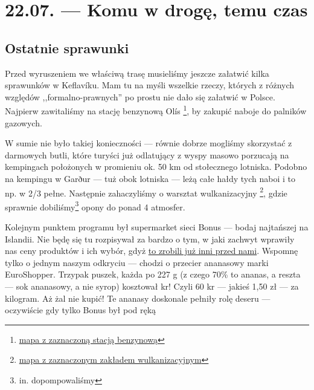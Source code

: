 \chapter*{22.07. --- Komu w drogę, temu czas}

\section*{Ostatnie sprawunki}

\indent Przed wyruszeniem we właściwą trasę musieliśmy jeszcze załatwić kilka sprawunków w Keflavíku. Mam tu na myśli wszelkie rzeczy, których z różnych względów ,,formalno-prawnych'' po prostu nie dało się załatwić w Polsce.
Najpierw zawitaliśmy na stację benzynową Olís \footnote{\href{https://www.google.com/url?q=https\%3A\%2F\%2Fmaps.google.com\%2Fmaps\%3Fq\%3D63.979816\%2C-22.54672}{mapa z zaznaczoną stacją benzynową}}, by zakupić naboje do palników gazowych.

W sumie nie było takiej konieczności --- równie dobrze mogliśmy skorzystać z darmowych butli, które turyści już odlatujący z wyspy masowo porzucają na kempingach położonych w promieniu ok. 50 km od stołecznego lotniska. Podobno na kempingu w Garður --- tuż obok lotniska --- leżą całe hałdy tych naboi i to np. w 2/3 pełne.
Następnie zahaczyliśmy o warsztat wulkanizacyjny \footnote{\href{https://www.google.com/url?q=https\%3A\%2F\%2Fmaps.google.com\%2Fmaps\%3Fq\%3D63.982619\%2C-22.546328}{mapa z zaznaczonym zakładem wulkanizacyjnym}}, gdzie sprawnie dobiliśmy\footnote{in. dopompowaliśmy} opony do ponad 4 atmosfer.



Kolejnym punktem programu był supermarket sieci Bonus --- bodaj najtańszej na Islandii. Nie będę się tu rozpisywał za bardzo o tym, w jaki zachwyt wprawiły nas ceny produktów i ich wybór, gdyż \href{http://www.roboppy.net/food/2009/04/iceland-day-1-part-ii-reykjavik-bonus-supermarket-skyr.html}{to zrobili już inni przed nami}. Wspomnę tylko o jednym naszym odkryciu --- chodzi o przecier ananasowy marki EuroShopper. Trzypak puszek, każda po 227 g (z czego 70\% to ananas, a reszta --- sok ananasowy, a nie syrop) kosztował kr! Czyli 60 kr --- jakieś 1,50 zł --- za kilogram. Aż żal nie kupić! Te ananasy doskonale pełniły rolę deseru --- oczywiście gdy tylko Bonus był pod ręką\textellipsis

